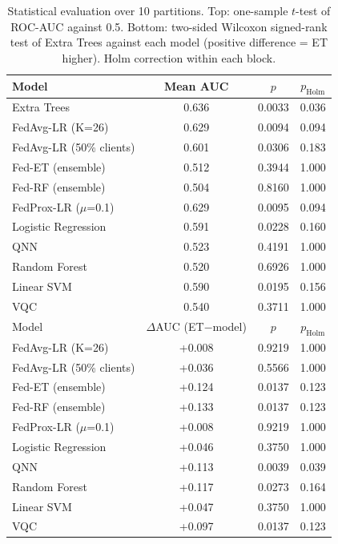 \begin{table}[!t]\centering\caption{Statistical evaluation over 10 partitions. Top: one-sample $t$-test of ROC-AUC against 0.5. Bottom: two-sided Wilcoxon signed-rank test of Extra Trees against each model (positive difference = ET higher). Holm correction within each block.}\label{tab:stats}\scriptsize\setlength{\tabcolsep}{3pt}\begin{tabular}{lccc}\toprule Model & Mean AUC & $p$ & $p_{\mathrm{Holm}}$\\\midrule
Extra Trees & 0.636 & 0.0033 & 0.036\\
FedAvg-LR (K=26) & 0.629 & 0.0094 & 0.094\\
FedAvg-LR (50\% clients) & 0.601 & 0.0306 & 0.183\\
Fed-ET (ensemble) & 0.512 & 0.3944 & 1.000\\
Fed-RF (ensemble) & 0.504 & 0.8160 & 1.000\\
FedProx-LR ($\mu$=0.1) & 0.629 & 0.0095 & 0.094\\
Logistic Regression & 0.591 & 0.0228 & 0.160\\
QNN & 0.523 & 0.4191 & 1.000\\
Random Forest & 0.520 & 0.6926 & 1.000\\
Linear SVM & 0.590 & 0.0195 & 0.156\\
VQC & 0.540 & 0.3711 & 1.000\\
\midrule Model & $\Delta$AUC (ET$-$model) & $p$ & $p_{\mathrm{Holm}}$\\\midrule
FedAvg-LR (K=26) & +0.008 & 0.9219 & 1.000\\
FedAvg-LR (50\% clients) & +0.036 & 0.5566 & 1.000\\
Fed-ET (ensemble) & +0.124 & 0.0137 & 0.123\\
Fed-RF (ensemble) & +0.133 & 0.0137 & 0.123\\
FedProx-LR ($\mu$=0.1) & +0.008 & 0.9219 & 1.000\\
Logistic Regression & +0.046 & 0.3750 & 1.000\\
QNN & +0.113 & 0.0039 & 0.039\\
Random Forest & +0.117 & 0.0273 & 0.164\\
Linear SVM & +0.047 & 0.3750 & 1.000\\
VQC & +0.097 & 0.0137 & 0.123\\
\bottomrule\end{tabular}\end{table}
